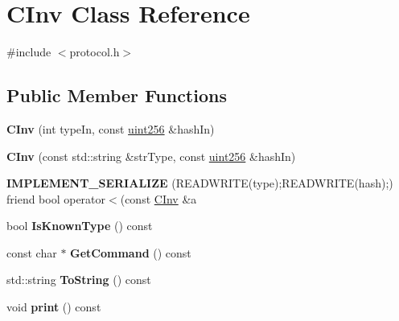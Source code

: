 \hypertarget{class_c_inv}{}\section{C\+Inv Class Reference}
\label{class_c_inv}


{\ttfamily \#include $<$protocol.\+h$>$}

\subsection*{Public Member Functions}
\begin{DoxyCompactItemize}
\item 
\mbox{\label{class_c_inv_a4c6e02df7b10378f876ecc76c6b50301}} 
{\bfseries C\+Inv} (int type\+In, const \mbox{\hyperlink{classuint256}{uint256}} \&hash\+In)
\item 
\mbox{\label{class_c_inv_a412cb8fdd0bfe185f770fec91a3e13c4}} 
{\bfseries C\+Inv} (const std\+::string \&str\+Type, const \mbox{\hyperlink{classuint256}{uint256}} \&hash\+In)
\item 
\mbox{\label{class_c_inv_a9b790317e3550228ef0f5de1a1b1aaa1}} 
{\bfseries I\+M\+P\+L\+E\+M\+E\+N\+T\+\_\+\+S\+E\+R\+I\+A\+L\+I\+ZE} (R\+E\+A\+D\+W\+R\+I\+TE(type);R\+E\+A\+D\+W\+R\+I\+TE(hash);) friend bool operator$<$(const \mbox{\hyperlink{class_c_inv}{C\+Inv}} \&a
\item 
\mbox{\label{class_c_inv_a3da7d96ce51443a1bfe8ce5342d0afbe}} 
bool {\bfseries Is\+Known\+Type} () const
\item 
\mbox{\label{class_c_inv_a29020c06b49edebfe9993adee93cf65a}} 
const char $\ast$ {\bfseries Get\+Command} () const
\item 
\mbox{\label{class_c_inv_a5bf13e9595035d2155b04cceb848c37d}} 
std\+::string {\bfseries To\+String} () const
\item 
\mbox{\label{class_c_inv_a4106071ddf2ada0676190a93875adcf5}} 
void {\bfseries print} () const
\end{DoxyCompactItemize}

